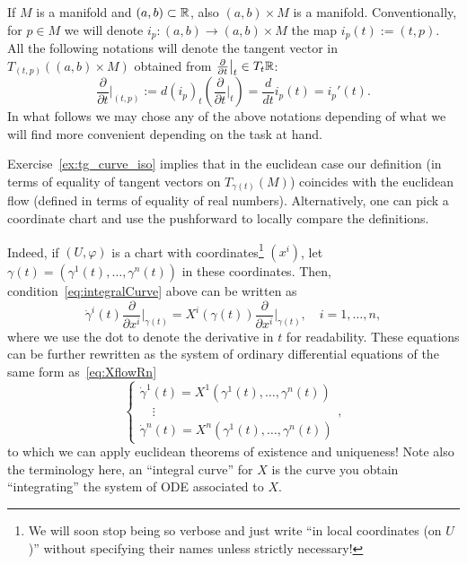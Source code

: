 \begin{notation}
  If $M$ is a manifold and $(a,b)\subset\mathbb{R}$, also $(a,b)\times M$ is a manifold. 
  Conventionally, for $p\in M$ we will denote $i_p : (a,b) \to (a,b)\times M$ the map $i_p(t) := (t,p)$.
  All the following notations will denote the tangent vector in $T_{(t,p)}((a,b)\times M)$ obtained from $\frac{\partial}{\partial t}\big|_t \in T_t\mathbb{R}$:
  \begin{equation}
    \frac{\partial}{\partial t}\Big|_{(t,p)} := d (i_p)_t\left(\frac{\partial}{\partial t}\Big|_t\right) = \frac{d}{d t}  i_p(t) = i_p'(t).
  \end{equation}
  In what follows we may chose any of the above notations depending of what we will find more convenient depending on the task at hand.
\end{notation}

Exercise~\ref{ex:tg_curve_iso} implies that in the euclidean case our definition (in terms of equality of tangent vectors on $T_{\gamma(t)}(M)$) coincides with the euclidean flow (defined in terms of equality of real numbers).
Alternatively, one can pick a coordinate chart and use the pushforward to locally compare the definitions.

Indeed, if $(U, \varphi)$ is a chart with coordinates\footnote{We will soon stop being so verbose and just write ``in local coordinates (on $U$)'' without specifying their names unless strictly necessary!} $(x^i)$, let $\gamma(t) = (\gamma^1(t), \ldots, \gamma^n(t))$ in these coordinates. Then, condition~\eqref{eq:integralCurve} above can be written as
\begin{equation}
  \dot\gamma^i(t)\frac{\partial}{\partial x^i}\Big|_{\gamma(t)}
  = X^i(\gamma(t))\frac{\partial}{\partial x^i}\Big|_{\gamma(t)},\quad i=1,\ldots,n,
\end{equation}
where we use the dot to denote the derivative in $t$ for readability.
These equations can be further rewritten as the system of ordinary differential equations of the same form as~\eqref{eq:XflowRn}
\begin{equation}
  \begin{cases}
    \dot\gamma^1(t) = X^1(\gamma^1(t), \ldots, \gamma^n(t)) \\
    \quad \vdots \\
    \dot\gamma^n(t) = X^n(\gamma^1(t), \ldots, \gamma^n(t))
  \end{cases},
\end{equation}
to which we can apply euclidean theorems of existence and uniqueness!
Note also the terminology here, an ``integral curve'' for $X$ is the curve you obtain ``integrating'' the system of ODE associated to $X$.


